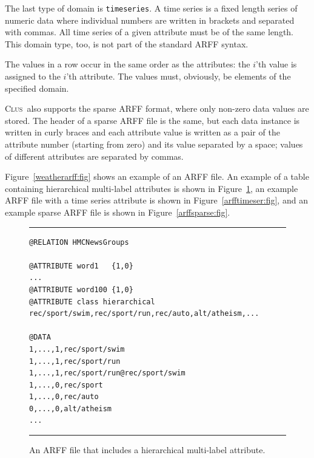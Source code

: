 \documentclass[a4paper]{report}
\newcommand{\clus}{\textsc{Clus}}
\begin{document}
The last type of domain is \texttt{timeseries}. A time series is a fixed length series of numeric data where individual numbers are written in brackets and separated with commas. All time series of a given attribute must be of the same length. This domain type, too, is not part of the standard ARFF syntax.

The values in a	 row occur in the same order as the attributes: the $i$'th value is assigned to the $i$'th attribute.  The values must, obviously, be elements of the specified domain.  

\clus\ also supports the sparse ARFF format, where only non-zero data values are stored. The header of a sparse ARFF file is the same, but each data instance is written in curly braces and each attribute value is written as a pair of the attribute number (starting from zero) and its value separated by a space; values of different attributes are separated by commas.

Figure~\ref{weatherarff:fig} shows an example of an ARFF file. An example of a table containing hierarchical multi-label attributes is shown in Figure~\ref{arffhmc:fig}, an example ARFF file with a time series attribute is shown in Figure~\ref{arfftimeser:fig}, and an example sparse ARFF file is shown in Figure~\ref{arffsparse:fig}.

\begin{figure}[tb]
\hrule\vspace{1em}
\begin{verbatim}
@RELATION HMCNewsGroups

@ATTRIBUTE word1   {1,0}
...
@ATTRIBUTE word100 {1,0}
@ATTRIBUTE class hierarchical rec/sport/swim,rec/sport/run,rec/auto,alt/atheism,...

@DATA
1,...,1,rec/sport/swim
1,...,1,rec/sport/run
1,...,1,rec/sport/run@rec/sport/swim
1,...,0,rec/sport
1,...,0,rec/auto
0,...,0,alt/atheism
...
\end{verbatim}
\hrule\vspace{1em}
\caption{An ARFF file that includes a hierarchical multi-label attribute.}
\label{arffhmc:fig}
\end{figure}
\end{document}
